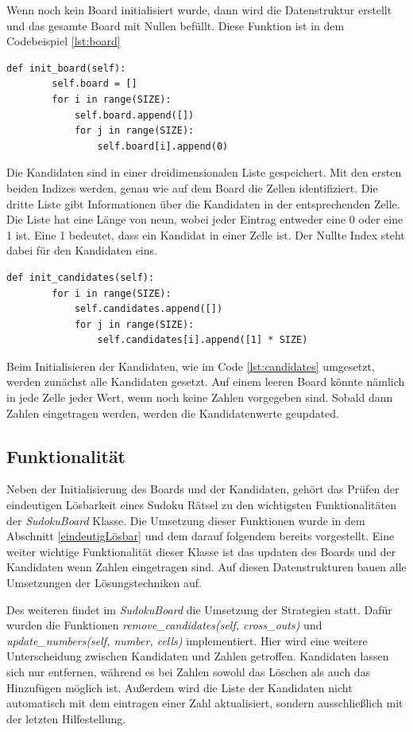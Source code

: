 Wenn noch kein Board initialisiert wurde, dann wird die Datenstruktur erstellt und das gesamte Board mit Nullen befüllt. Diese Funktion ist in dem Codebeispiel \ref{lst:board} 

\begin{lstlisting}[caption={Initalisierung des Boards}, label={lst:board}]
	def init_board(self):
		self.board = []
		for i in range(SIZE):
			self.board.append([])
			for j in range(SIZE):
				self.board[i].append(0)
\end{lstlisting}

Die Kandidaten sind in einer dreidimensionalen Liste gespeichert. Mit den ersten beiden Indizes werden, genau wie auf dem Board die Zellen identifiziert. Die dritte Liste gibt Informationen über die Kandidaten in der entsprechenden Zelle. Die Liste hat eine Länge von neun, wobei jeder Eintrag entweder eine 0 oder eine 1 ist. Eine 1 bedeutet, dass ein Kandidat in einer Zelle ist. Der Nullte Index steht dabei für den Kandidaten eins.

\begin{lstlisting}[caption={Initalisierung der Kandidaten}, label={lst:candidates}]
	def init_candidates(self):
		for i in range(SIZE):
			self.candidates.append([])
			for j in range(SIZE):
				self.candidates[i].append([1] * SIZE)
\end{lstlisting}

Beim Initialisieren der Kandidaten, wie im Code \ref{lst:candidates} umgesetzt, werden zunächst alle Kandidaten gesetzt. Auf einem leeren Board könnte nämlich in jede Zelle jeder Wert, wenn noch keine Zahlen vorgegeben sind. Sobald dann Zahlen eingetragen werden, werden die Kandidatenwerte geupdated.

\subsection{Funktionalität}
Neben der Initialisierung des Boards und der Kandidaten, gehört das Prüfen der eindeutigen Lösbarkeit eines Sudoku Rätsel zu den wichtigsten Funktionalitäten der \textit{SudokuBoard} Klasse. Die Umsetzung dieser Funktionen wurde in dem Abschnitt \ref{eindeutigLösbar} und dem darauf folgendem bereits vorgestellt. Eine weiter wichtige Funktionalität dieser Klasse ist das updaten des Boards und der Kandidaten wenn Zahlen eingetragen sind. Auf diesen Datenstrukturen bauen alle Umsetzungen der Lösungstechniken auf. 

Des weiteren findet im \textit{SudokuBoard} die Umsetzung der Strategien statt. Dafür wurden die Funktionen \textit{remove\_candidates(self, cross\_outs)} und \textit{update\_numbers(self, number, cells)} implementiert. Hier wird eine weitere Unterscheidung zwischen Kandidaten und Zahlen getroffen. Kandidaten lassen sich nur entfernen, während es bei Zahlen sowohl das Löschen als auch das Hinzufügen möglich ist. Außerdem wird die Liste der Kandidaten nicht automatisch mit dem eintragen einer Zahl aktualisiert, sondern ausschließlich mit der letzten Hilfestellung.


